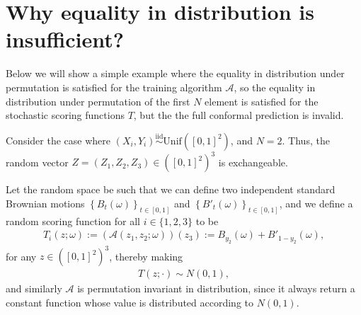 \documentclass{article}
\newcommand{\oo}[1]{\left( #1 \right)}
\begin{document}
\section{Why equality in distribution is insufficient?}
\label{section:distributionisnotdufficiebt}

    Below we will show a simple example where the equality in distribution under permutation is satisfied for the training algorithm $\mathcal{A}$, so
    the equality in distribution under permutation of the first $N$ element is satisfied for the stochastic scoring functions $T$, but the the full conformal prediction is invalid.

    Consider the case where $(X_i,Y_i) \overset{\text{iid}}{\sim} \text{Unif}\left([0,1]^2\right)$, and $N=2$. Thus, the random vector $Z = (Z_1, Z_2, Z_3) \in \oo{[0,1]^2}^3$ is exchangeable.
    
    Let the random space be such that we can define two independent standard Brownian motions $\left\{B_t(\omega)\right\}_{t \in [0,1]}$ and $\left\{B'_t(\omega)\right\}_{t \in [0,1]}$, and we define a random scoring function for all $i \in \{1,2,3\}$ to be
    \begin{align*}
        T_i\left(z; \omega\right) := \oo{\mathcal{A}\left(z_1, z_2; \omega\right)}(z_3)
        :=
        B_{y_2}(\omega) + B'_{1-y_2}(\omega),
    \end{align*}
    for any $z \in \oo{[0,1]^2}^3$, thereby making
    \begin{align*}
        T\left(z; \cdot\right) \sim N(0,1),
    \end{align*}
    and similarly $\mathcal{A}$ is permutation invariant in distribution, since it always return a constant function whose value is distributed according to $N(0,1)$.
\end{document}
